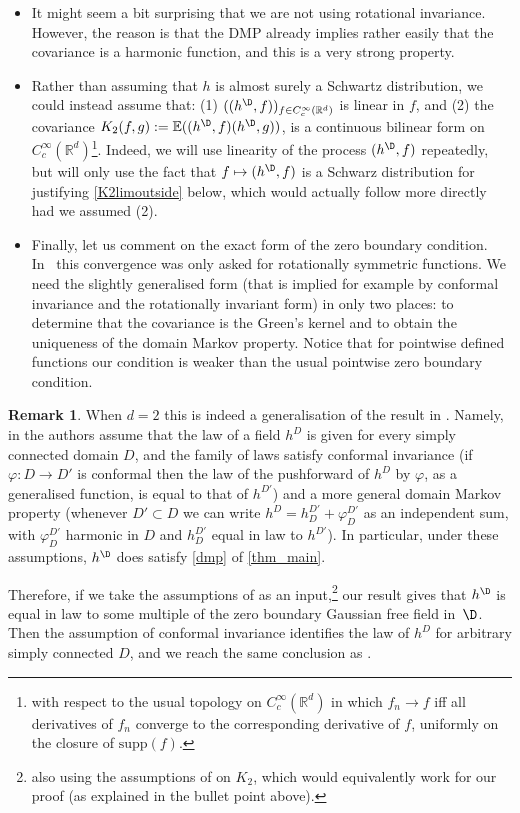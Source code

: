 \documentclass[10pt]{amsart}
\theoremstyle{definition}
\newtheorem{rmk}[theorem]{Remark}
\newcommand{\R}{\mathbb{R}}
\newcommand{\E}{\mathbb{E}}
\begin{document}
\begin{itemize}
\item It might seem a bit surprising that we are not using rotational invariance. However, the reason is that the DMP already implies rather easily that the covariance is a harmonic function, and this is a very strong property.
\item Rather than assuming that $h$ is almost surely a Schwartz distribution, we could instead assume that: (1) $((h^\D,f))_{f \in C_c^\infty(\R^d)}$ is linear in $f$, and (2) the covariance $K_2(f,g):=\E((h^\D,f)(h^\D,g))$, is a continuous bilinear form on $C_c^\infty(\R^d)$\footnote{with respect to the usual topology on $C_c^\infty(\R^d)$ in which $f_n\to f$ iff all derivatives of $f_n$ converge to the corresponding derivative of $f$, uniformly on the closure of ${\mathrm{supp}(f)}$.}. Indeed, we will use linearity of the process $(h^{\D},f)$ repeatedly, but will only use the fact that $f\mapsto (h^{\D},f)$ is a Schwarz distribution for justifying \eqref{K2limoutside} below, which would actually follow more directly had we assumed (2).
\item Finally, let us comment on the exact form of the zero boundary condition. In~\cite{BPR18} this convergence was only asked for rotationally symmetric functions. We need the slightly generalised form (that is implied for example by conformal invariance and the rotationally invariant form) in only two places: to determine that the covariance is the Green's kernel and to obtain the uniqueness of the domain Markov property. Notice that for pointwise defined functions our condition is weaker than the usual pointwise zero boundary condition.
\end{itemize}

\begin{rmk}
When $d=2$ this is indeed a generalisation of the result in \cite{BPR18}. Namely, in \cite{BPR18} the authors assume that the law of a field $h^D$ is given for \hbox{every} simply connected domain $D$, and the family of laws satisfy conformal invariance (if~$\varphi:D\to D'$ is conformal then the law of the pushforward of $h^D$ by $\varphi$, as a generalised function, is equal to that of $h^{D'}$) and a more general domain Markov property (whenever $D'\subset D$ we can write $h^D=h_D^{D'}+\varphi_D^{D'}$ as an independent sum, with $\varphi_D^{D'}$ harmonic in $D$ and $h_D^{D'}$ equal in law to $h^{D'}$). In particular, under these assumptions, $h^{\D}$ does satisfy \eqref{dmp} of \cref{thm_main}.

Therefore, if we take the assumptions of \cite{BPR18} as an input,\footnote{also using the assumptions of \cite{BPR18} on $K_2$, which would equivalently work for our proof (as explained in the bullet point above).} our result gives that $h^{\D}$ is equal in law to some multiple of the zero boundary Gaussian free field in~$\D$. Then the assumption of conformal invariance identifies the law of $h^D$ for arbitrary simply connected $D$, and we reach the same conclusion as \cite{BPR18}.
\end{rmk}
\end{document}

